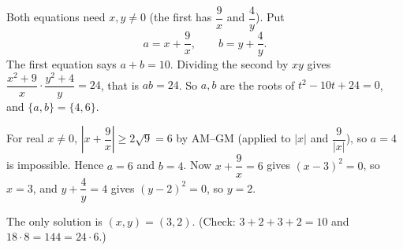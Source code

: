 Both equations need $x,y\ne0$ (the first has $\dfrac{9}{x}$ and $\dfrac{4}{y}$). Put
\[
a=x+\dfrac{9}{x},\qquad b=y+\dfrac{4}{y} .
\]
The first equation says $a+b=10$. Dividing the second by $xy$ gives $\dfrac{x^2+9}{x}\cdot\dfrac{y^2+4}{y}=24$, that is $ab=24$. So $a,b$ are the roots of $t^2-10t+24=0$, and $\{a,b\}=\{4,6\}$.

For real $x\ne0$, $\left|x+\dfrac{9}{x}\right|\ge 2\sqrt9=6$ by AM--GM (applied to $|x|$ and $\dfrac{9}{|x|}$), so $a=4$ is impossible. Hence $a=6$ and $b=4$. Now $x+\dfrac{9}{x}=6$ gives $(x-3)^2=0$, so $x=3$, and $y+\dfrac{4}{y}=4$ gives $(y-2)^2=0$, so $y=2$.

The only solution is $\boxed{(x,y)=(3,2)}$. (Check: $3+2+3+2=10$ and $18\cdot8=144=24\cdot6$.)
